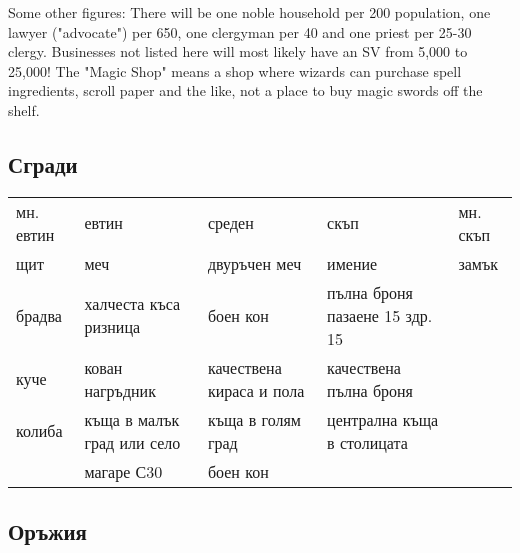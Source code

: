 Some other figures: There will be one noble household per 200 population, one lawyer ("advocate") per 650, one clergyman per 40 and one priest per 25-30 clergy. Businesses not listed here will most likely have an SV from 5,000 to 25,000! The "Magic Shop" means a shop where wizards can purchase spell ingredients, scroll paper and the like, not a place to buy magic swords off the shelf. 

\subsection{Сгради}
\begin{tabular}{p{3cm} | p{3cm} | p{3cm} | p{3cm} | p{3cm}}
мн. евтин & евтин                                   & среден                   & скъп                           & мн. скъп  \\
щит       & меч                                     & двуръчен меч             & имение                         & замък     \\
брадва    & халчеста къса ризница                   & боен кон                 & пълна броня пазаене 15 здр. 15 &           \\
куче      & кован нагръдник                         & качествена кираса и пола & качествена пълна броня         &           \\
колиба    & къща в малък град или село              & къща в голям град        & централна къща в столицата                 \\
          & магаре С30                              & боен кон                 &
\end{tabular}


\subsection{Оръжия}
\newcommand{\weapon}[8]
{
\begin{multicols}{2}
  \noindent \textbf{#2} \\
  Необходима сила: #3  \\
  Обсег: #4  \\
  Щети: #5  \\
  Свойства: #6  \\
  Маса: #7  \\
  Стойност: #8  \\
  \texttt{[image: ../images/\#1]}~
\end{multicols}
}

